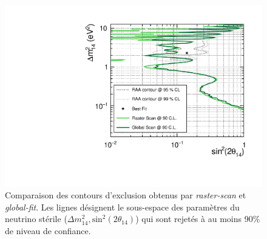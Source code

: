 {\begin{figure}[h!]
  \centering
  \includegraphics[width=0.75\linewidth]{images/contours_global_vs_raster_DATA.pdf}
  \caption[Comparaison des contours d'exclusion obtenus par \textit{raster-scan} et \textit{global-fit}]{Comparaison des contours d'exclusion obtenus par \textit{raster-scan} et \textit{global-fit}. Les lignes désignent le sous-espace des paramètres du neutrino stérile ($\Delta m_{14}^2, \textrm{sin}^2\left(2\theta_{14}\right)$) qui sont rejetés à au moins 90\% de niveau de confiance.}
  \label{fig:contours_global_vs_raster_DATA.pdf}
\end{figure}

\clearpage


}

